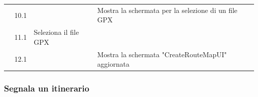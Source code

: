 \documentclass{natourDoc}
\begin{document}
\begin{tabularx}{\linewidth}{| l | p{1cm} | p{4cm} | X | X|}
	\cline{2-5}                   & 10.1                                                                                                                                   &                                                                                                                                                                      & Mostra la schermata per la selezione di un file GPX &                                                                                       \\

	\cline{2-5}                   & 11.1                                                                                                                                   & Seleziona il file GPX                                                                                                                                                &                                                     &                                                                                       \\

	\cline{2-5}                   & 12.1                                                                                                                                   &                                                                                                                                                                      & Mostra la schermata "CreateRouteMapUI" aggiornata   &                                                                                       \\

	\hline
\end{tabularx}

\newpage

\subsubsection{Segnala un itinerario}
\end{document}
